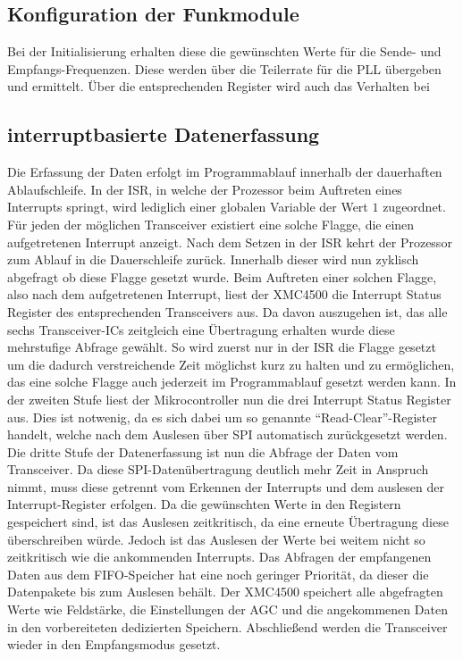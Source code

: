 
\subsection{Konfiguration der Funkmodule}

 Bei der Initialisierung erhalten diese die gewünschten Werte für die Sende- und Empfangs-Frequenzen. Diese werden über die Teilerrate für die  \ac{PLL} übergeben und ermittelt. Über die entsprechenden Register wird auch das Verhalten bei
\subsection{interruptbasierte Datenerfassung}


Die Erfassung der Daten erfolgt im Programmablauf innerhalb der dauerhaften Ablaufschleife.
In der \acl{ISR}, in welche der Prozessor beim Auftreten eines Interrupts springt, wird lediglich einer globalen Variable der Wert $1$ zugeordnet. Für jeden der möglichen Transceiver existiert eine solche Flagge, die einen aufgetretenen Interrupt anzeigt. Nach dem Setzen in der \ac{ISR} kehrt der Prozessor zum Ablauf in die Dauerschleife zurück. Innerhalb dieser wird nun zyklisch abgefragt ob diese Flagge gesetzt wurde. Beim Auftreten einer solchen Flagge, also nach dem aufgetretenen Interrupt, liest der XMC4500 die  Interrupt Status Register des entsprechenden Transceivers aus. 
Da davon auszugehen ist, das alle sechs Transceiver-\acp{IC} zeitgleich eine Übertragung erhalten wurde diese mehrstufige Abfrage gewählt. So wird zuerst nur in der \ac{ISR} die Flagge gesetzt um die dadurch verstreichende Zeit möglichst kurz zu halten und zu ermöglichen, das eine solche Flagge auch jederzeit im Programmablauf gesetzt werden kann. In der zweiten Stufe liest der Mikrocontroller nun die drei Interrupt Status Register aus. Dies ist notwenig, da es sich dabei um so genannte \enquote{Read-Clear}-Register handelt, welche  nach dem Auslesen über SPI automatisch zurückgesetzt werden.
Die dritte Stufe  der Datenerfassung ist nun die Abfrage der Daten vom Transceiver. Da diese \ac{SPI}-Datenübertragung deutlich mehr Zeit in Anspruch nimmt, muss diese getrennt vom Erkennen der Interrupts und dem auslesen der Interrupt-Register erfolgen. Da die gewünschten Werte in den Registern gespeichert sind, ist das Auslesen zeitkritisch, da eine erneute Übertragung diese überschreiben würde. Jedoch ist das Auslesen der Werte bei weitem nicht so zeitkritisch wie die ankommenden Interrupts. Das Abfragen der empfangenen Daten aus dem \ac{FIFO}-Speicher hat eine noch geringer Priorität, da dieser die Datenpakete bis zum Auslesen behält. Der XMC4500 speichert alle abgefragten Werte wie Feldstärke, die Einstellungen der \ac{AGC} und die angekommenen Daten in den vorbereiteten dedizierten Speichern. Abschließend werden die Transceiver wieder in den Empfangsmodus gesetzt. 



